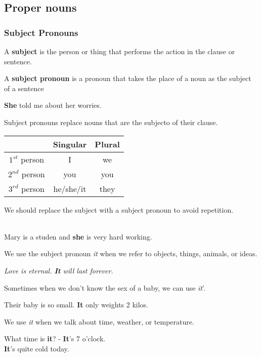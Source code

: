 \documentclass[10pt,a4paper]{article}
\begin{document}
\subsection{Proper nouns}
\subsubsection{Subject Pronouns}
A \textbf{subject} is the person or thing that performs the action in the clause or sentence.

A \textbf{subject pronoun} is a pronoun that takes the place of a noun as the subject of a sentence

\begin{center}
	\textbf{She} told me about her worries.
\end{center}
Subject pronouns replace nouns that are the subjecto of their clause.

\begin{center}
		\begin{tabular}{|c|c|c|}
		\hline
		& \textbf{Singular} & \textbf{Plural} \\
		\hline
		$1^{st}$ person & I & we \\
		$2^{nd}$ person & you & you \\
		$3^{rd}$ person & he/she/it & they \\
		\hline
	\end{tabular}
\end{center}
\newpage
We should replace the subject with a subject pronoun to avoid repetition.
\begin{center}
\\
Mary is a studen and \textbf{she} is very hard working.
\end{center}

We use the subject pronoun \textit{it} when we refer to objects, things, animals, or ideas.
\begin{center}
		\textit{ Love is eternal. \textbf{It} will last forever.}
\end{center}

Sometimes when we don't know the sex of a baby, we can use \textit{it}'.
\begin{center}
	Their baby is so small. \textbf{It} only weights 2 kilos.
\end{center}
\hspace{0.4cm} We use \textit{it} when we talk about time, weather, or temperature.
\begin{center}
	What time is \textbf{it}? - \textbf{It}'s 7 o'clock.\\
	\textbf{It}'s quite cold today.
\end{center}
\end{document}
